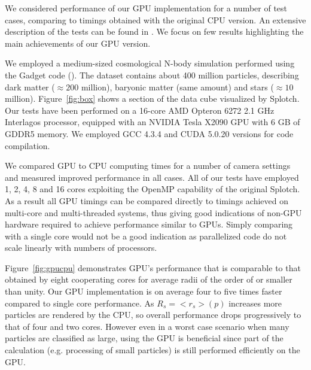 We considered performance of our GPU implementation for a number of test cases, comparing to timings obtained with the original CPU version. An extensive description of the tests can be found in \citet{cusplotch}. We focus on few results highlighting the main achievements of our GPU version.

We employed a medium-sized cosmological N-body simulation performed using the Gadget code (\citet{springel2005}). The dataset contains about 400 million particles, describing dark matter ($\approx 200$ million), baryonic matter (same amount) and stars ($\approx 10$ million). Figure~\ref{fig:box} shows a section of the data cube visualized by Splotch. Our tests have been performed on a 16-core AMD Opteron 6272 2.1 GHz Interlagos processor, equipped with an NVIDIA Tesla X2090 GPU with 6 GB of GDDR5 memory. We employed GCC 4.3.4 and CUDA 5.0.20 versions for code compilation.

We compared GPU to CPU computing times for a number of camera settings and measured improved performance in all cases. All of our tests have employed 1, 2, 4, 8 and 16 cores exploiting the OpenMP capability of the original Splotch. As a result all GPU timings can be compared directly to timings achieved on multi-core and multi-threaded systems, thus giving good indications of non-GPU hardware required to achieve performance similar to GPUs. Simply comparing with a single core would not be a good indication as parallelized code do not scale linearly with numbers of processors.

Figure~\ref{fig:gpucpu} demonstrates GPU's performance that is comparable to that obtained by eight cooperating cores for average radii of the order of or smaller than unity. Our GPU implementation is on average four to five times faster compared to single core performance. As $R_s=<r_s>(p)$ increases more particles are rendered by the CPU, so overall performance drops progressively to that of four and two cores. However even in a worst case scenario when many particles are classified as large, using the GPU is beneficial since part of the calculation (e.g. processing of small particles) is still performed efficiently on the GPU.

